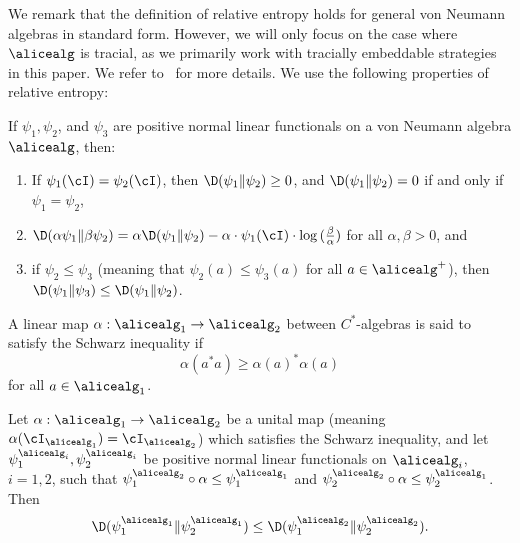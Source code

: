 We remark that the definition of relative entropy holds for general von Neumann algebras in standard form. However, we will only focus on the case where $\alicealg$ is tracial, as we primarily work with tracially embeddable strategies in this paper. We refer to~\cite{arakiRelativeEntropyStates1977, ohyaQuantumEntropyIts2004} for more details. We use the following properties of relative entropy:
\begin{proposition} \label{prop:properties_entropy}
	If $\psi_1, \psi_2$, and $\psi_3$ are positive normal linear functionals on a von Neumann algebra $\alicealg$, then:
	\begin{enumerate}
		\item If $\psi_1(\cI) = \psi_2(\cI)$, then $\D(\psi_1 \| \psi_2) \geq 0$, and $\D(\psi_1 \| \psi_2) = 0$ if and only if $\psi_1 = \psi_2$,
		\item $\D(\alpha \psi_1 \| \beta \psi_2) = \alpha \D(\psi_1 \| \psi_2) - \alpha \cdot \psi_1(\cI) \cdot  \log{(\frac{\beta}{\alpha})}$ for all $\alpha, \beta > 0$, and
		\item if $\psi_2 \leq \psi_3$ (meaning that $\psi_2(a) \leq \psi_3(a)$ for all $a \in \alicealg^{+}$),  then $\D(\psi_1\| \psi_3) \leq \D(\psi_1 \| \psi_2)$.
	\end{enumerate}
\end{proposition}
A linear map $\alpha : \alicealg_1 \to \alicealg_2$ between $C^*$-algebras is said to satisfy the Schwarz inequality if \begin{equation*}
	\alpha(a^* a) \geq \alpha(a)^* \alpha(a)
\end{equation*}
for all $a \in \alicealg_1$.

\begin{proposition}\label{prop:Uhlmann_monotonicity_Schwarz}
	Let $\alpha: \alicealg_1 \rightarrow \alicealg_2$ be a unital map (meaning $\alpha(\cI_{\alicealg_1}) = \cI_{\alicealg_2}$) which satisfies the Schwarz inequality, and let $\psi_1^{\alicealg_i}, \psi_2^{\alicealg_i}$ be positive normal linear functionals on $\alicealg_i$, $i=1,2$, such that $\psi_1^{\alicealg_2} \circ \alpha \leq \psi_1^{\alicealg_1}$ and  $\psi_2^{\alicealg_2} \circ \alpha \leq \psi_2^{\alicealg_1}$. Then 
	\begin{equation*}
		\D(\psi_1^{\alicealg_1} \| \psi_2^{\alicealg_1}) \leq \D(\psi_1^{\alicealg_2} \| \psi_2^{\alicealg_2}).
	\end{equation*} 
\end{proposition}

